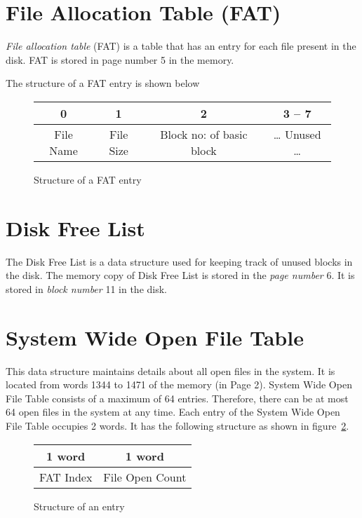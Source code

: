 \documentclass[10pt]{report}
\begin{document}
\section{File Allocation Table (FAT)}
\label{sec:fat}
\emph{File allocation table} (FAT) is a table that has an entry for each file present in the disk. FAT is stored in page number 5 in the memory. \\



The structure of a FAT entry is shown below 

\begin{figure}[htp!] \small
	\centering
	\begin{tabular}{|c|c|c|c|}
		\hline
		0 & 1 & 2 & 3 -- 7 \\
		\hline
		File Name & File Size & Block no: of basic block & \dots{} Unused \dots \\
		\hline
	\end{tabular}
	\caption{Structure of a FAT entry}
	\label{fig:fat_entry}
\end{figure}



\section{Disk Free List}
\label{sec:disk free list}
The Disk Free List is a data structure used for keeping track of unused blocks in the disk. The memory copy of Disk Free List is stored in the \textit{page number} 6. It is stored in \textit{block number} 11 in the disk. 


\section{System Wide Open File Table}
\label{sec:file table}
	
This data structure maintains details about all open files in the system. It is located from words 1344 to 1471 of the memory (in Page 2). System Wide Open File Table consists of a maximum of 64 entries. 
Therefore, there can be at most 64 open files in the system at any time. Each entry of the System Wide Open File Table occupies 2 words. It has the following structure as shown in figure~\ref{fig:file table}.

	 \begin{figure}[h!]
		 \centering
			\begin{tabular}{|c|c|}
				1 word & 1 word	\\		
				\hline
				FAT Index & File Open Count\\
				\hline
			\end{tabular}
		 \caption{Structure of an entry}
		 \label{fig:file table}
	 \end{figure}
\end{document}
